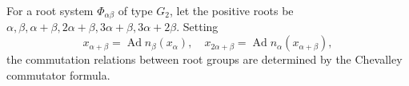 For a root system $\Phi_{\alpha\beta}$ of type $G_2$, let the positive roots be $\alpha, \beta, \alpha+\beta, 2\alpha+\beta, 3\alpha+\beta, 3\alpha+2\beta$. Setting
$$x_{\alpha+\beta} = \operatorname{Ad} n_\beta(x_\alpha), \quad x_{2\alpha+\beta} = \operatorname{Ad} n_\alpha(x_{\alpha+\beta}),$$
the commutation relations between root groups are determined by the Chevalley commutator formula.
